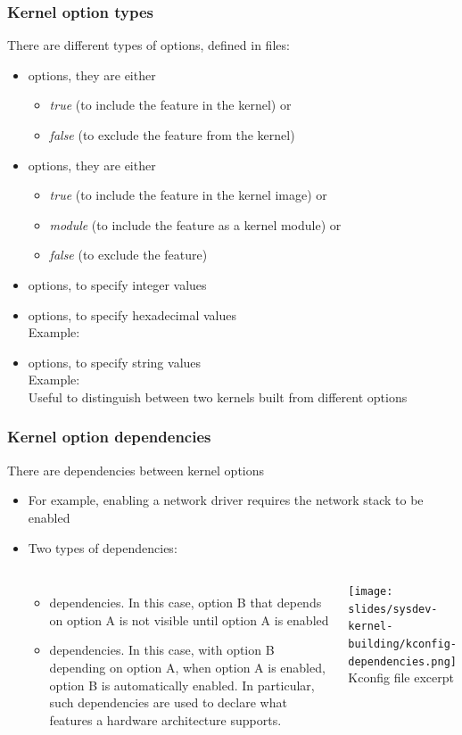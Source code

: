 \begin{frame}
  \frametitle{Kernel option types}
  There are different types of options, defined in  files:
  \begin{itemize}
  \item {} options, they are either
    \begin{itemize}
    \item {\em true} (to include the feature in the kernel) or
    \item {\em false} (to exclude the feature from the kernel)
    \end{itemize}
  \item {} options, they are either
    \begin{itemize}
    \item {\em true} (to include the feature in the kernel image) or
    \item {\em module} (to include the feature as a kernel module) or
    \item {\em false} (to exclude the feature)
    \end{itemize}
  \item {} options, to specify integer values
  \item {} options, to specify hexadecimal values\\
    Example: 
  \item {} options, to specify string values\\
    Example: \\
    Useful to distinguish between two kernels built from different options
  \end{itemize}
\end{frame}

\begin{frame}[fragile]
  \frametitle{Kernel option dependencies}
  There are dependencies between kernel options
  \begin{itemize}
  \item For example, enabling a network driver requires the network
    stack to be enabled
  \item Two types of dependencies:
  \begin{columns}
    \begin{itemize}
    \item {} dependencies. In this case, option B that
      depends on option A is not visible until option A is enabled
    \item {} dependencies. In this case, with option B
      depending on option A, when option A is enabled, option B is
      automatically enabled. In particular, such dependencies are
      used to declare what features a hardware architecture supports.
    \end{itemize}
    \texttt{[image: slides/sysdev-kernel-building/kconfig-dependencies.png]}\\
    \footnotesize Kconfig file excerpt
  \end{columns}
  \end{itemize}
\end{frame}

